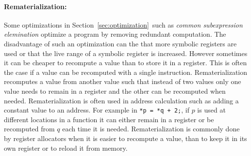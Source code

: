 \documentclass[a4paper,10pt]{article}
\begin{document}
\paragraph{Rematerialization:} Some optimizations in Section\, \ref{sec:optimization}\, such as \textit{common subexpression elemination} optimize a program by removing redundant computation. The disadvantage of such an optimization can the that more symbolic registers are used or that the live range of a symbolic register is increased. However sometimes it can be cheaper to recompute a value than to store it in a register. This is often the case if a value can be recomputed with a single instruction. Rematerialization recomputes a value from another value such that instead of two values only one value needs to remain in a register and the other can be recomputed when needed. Rematerialization is often used in address calculation such as adding a constant value to an address. For example in \lstinline|*p = *q + 2;|, if $p$ is used at different locations in a function it can either remain in a register or be recomputed from $q$ each time it is needed. Rematerialization is commonly done by register allocators when it is easier to recompute a value, than to keep it in its own register or to reload it from memory.
\end{document}
